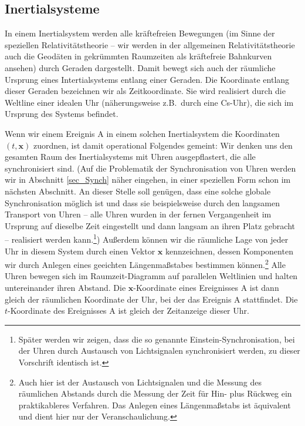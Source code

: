 \subsection{Inertialsysteme}

In einem Inertialsystem werden 
alle kr\"aftefreien Bewegungen (im Sinne
der speziellen Relativit\"atstheorie --
wir werden in der allgemeinen Relativit\"atstheorie
auch die Geod\"aten
in gekr\"ummten Raumzeiten als
kr\"aftefreie Bahnkurven ansehen) durch
Geraden dargestellt. Damit bewegt
sich auch der r\"aumliche Ursprung
eines Intertialsys\-tems entlang einer 
Geraden. Die Koordinate entlang
dieser Geraden bezeichnen wir als
Zeitkoordinate. Sie wird realisiert
durch die Weltline einer idealen Uhr 
(n\"aherungsweise
z.B.\ durch eine Cs-Uhr), die sich im
Ursprung des Systems befindet. 

Wenn wir einem Ereignis A in einem 
solchen Inertialsystem die Koordinaten
$(t,\pmb{x})$ zuordnen, ist damit operational 
Folgendes gemeint: Wir denken uns den gesamten
Raum des Inertialsystems mit Uhren
ausgepflastert, die alle synchronisiert
sind. (Auf die Problematik der Synchronisation
von Uhren werden wir in Abschnitt
\ref{sec_Synch} n\"aher eingehen, in einer
speziellen Form schon im n\"achsten Abschnitt.  
An dieser Stelle soll gen\"ugen, dass eine
solche globale Synchronisation m\"oglich
ist und dass sie beispielsweise durch den
langsamen Transport von Uhren --
alle Uhren wurden in der fernen Vergangenheit
im Ursprung auf dieselbe Zeit eingestellt und dann
langsam an ihren Platz gebracht --
realisiert werden kann.\footnote{Sp\"ater 
werden wir zeigen, dass die so genannte
Einstein-Synchronisation, bei der Uhren durch
Austausch von Lichtsignalen synchronisiert
werden, zu dieser Vorschrift identisch ist.}) 
Au\ss erdem k\"onnen wir 
die r\"aumliche Lage von jeder Uhr in diesem Sys\-tem
durch einen Vektor $\pmb{x}$ kennzeichnen,
dessen Komponenten wir durch Anlegen
eines geeichten L\"angenma\ss stabes bestimmen
k\"onnen.\footnote{Auch hier ist der Austausch
von Lichtsignalen und die Messung des
r\"aumlichen Abstands durch die Messung der
Zeit f\"ur Hin- plus R\"uckweg ein praktikableres
Verfahren. Das Anlegen eines L\"angenma\ss stabs
ist \"aquivalent und dient hier nur der 
Veranschaulichung.} Alle Uhren bewegen sich
im Raumzeit-Diagramm auf parallelen Weltlinien
und halten untereinander ihren Abstand. 
Die $\pmb{x}$-Koordinate
eines Ereignisses A ist dann gleich der
r\"aumlichen Koordinate der Uhr, bei der
das Ereignis A stattfindet. Die $t$-Koordinate
des Ereignisses A ist gleich der Zeitanzeige
dieser Uhr. 
 
